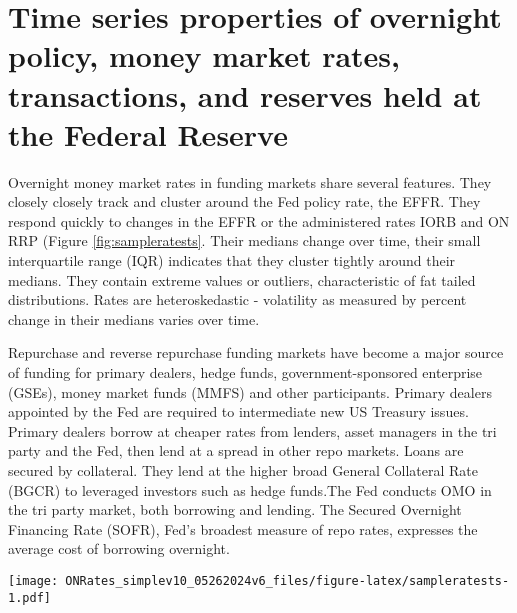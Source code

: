 \documentclass[
]{article}
\let\origfigure\figure
\let\endorigfigure\endfigure
\renewenvironment{figure}[1][2] {
    \expandafter\origfigure\expandafter[H]
} {
    \endorigfigure
}
\begin{document}
\hypertarget{time-series-properties-of-overnight-policy-money-market-rates-transactions-and-reserves-held-at-the-federal-reserve}{%
\section{Time series properties of overnight policy, money market rates, transactions, and reserves held at the Federal Reserve}\label{time-series-properties-of-overnight-policy-money-market-rates-transactions-and-reserves-held-at-the-federal-reserve}}

Overnight money market rates in funding markets share several features. They closely closely track and cluster around the Fed policy rate, the EFFR. They respond quickly to changes in the EFFR or the administered rates IORB and ON RRP (Figure \ref{fig:sampleratests}. Their medians change over time, their small interquartile range (IQR) indicates that they cluster tightly around their medians. They contain extreme values or outliers, characteristic of fat tailed distributions. Rates are heteroskedastic - volatility as measured by percent change in their medians varies over time.

Repurchase and reverse repurchase funding markets have become a major source of funding for primary dealers, hedge funds, government-sponsored enterprise (GSEs), money market funds (MMFS) and other participants. Primary dealers appointed by the Fed are required to intermediate new US Treasury issues. Primary dealers borrow at cheaper rates from lenders, asset managers in the tri party and the Fed, then lend at a spread in other repo markets. Loans are secured by collateral. They lend at the higher broad General Collateral Rate (BGCR) to leveraged investors such as hedge funds.The Fed conducts OMO in the tri party market, both borrowing and lending. The Secured Overnight Financing Rate (SOFR), Fed's broadest measure of repo rates, expresses the average cost of borrowing overnight.

\begin{figure}
\centering
\texttt{[image: ONRates\_simplev10\_05262024v6\_files/figure-latex/sampleratests-1.pdf]}
\caption{\label{fig:sampleratests}Sample reference rates 3/4/2016-12/14/2023}
\end{figure}
\end{document}
